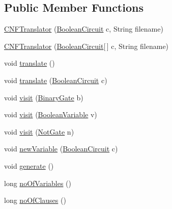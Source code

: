 \subsection*{Public Member Functions}
\begin{DoxyCompactItemize}
\item 
\hyperlink{classuran_1_1formula_1_1cnf_1_1_c_n_f_translator_ae56a0dc54a2ef3be4ddb496b57ba224d}{C\+N\+F\+Translator} (\hyperlink{classuran_1_1formula_1_1cnf_1_1_boolean_circuit}{Boolean\+Circuit} c, String filename)
\item 
\hyperlink{classuran_1_1formula_1_1cnf_1_1_c_n_f_translator_a9f75243260e3af2aebe1e1466bbe5996}{C\+N\+F\+Translator} (\hyperlink{classuran_1_1formula_1_1cnf_1_1_boolean_circuit}{Boolean\+Circuit}\mbox{[}$\,$\mbox{]} c, String filename)
\item 
void \hyperlink{classuran_1_1formula_1_1cnf_1_1_c_n_f_translator_a8cfa090e193eeb2a77a013a1d462576e}{translate} ()
\item 
void \hyperlink{classuran_1_1formula_1_1cnf_1_1_c_n_f_translator_a9d52eae57163cb730e343c1071cf0091}{translate} (\hyperlink{classuran_1_1formula_1_1cnf_1_1_boolean_circuit}{Boolean\+Circuit} c)
\item 
void \hyperlink{classuran_1_1formula_1_1cnf_1_1_c_n_f_translator_a3248f27b474b29e715e86fa4accf99eb}{visit} (\hyperlink{classuran_1_1formula_1_1cnf_1_1_binary_gate}{Binary\+Gate} b)
\item 
void \hyperlink{classuran_1_1formula_1_1cnf_1_1_c_n_f_translator_a9e35ea3cb123b609d8ea5eb28cb8a582}{visit} (\hyperlink{classuran_1_1formula_1_1cnf_1_1_boolean_variable}{Boolean\+Variable} v)
\item 
void \hyperlink{classuran_1_1formula_1_1cnf_1_1_c_n_f_translator_ae1e16723069c2bc4f493a7d04dff4186}{visit} (\hyperlink{classuran_1_1formula_1_1cnf_1_1_not_gate}{Not\+Gate} n)
\item 
void \hyperlink{classuran_1_1formula_1_1cnf_1_1_c_n_f_translator_a647b4754a2c7cedd0cb452463927efff}{new\+Variable} (\hyperlink{classuran_1_1formula_1_1cnf_1_1_boolean_circuit}{Boolean\+Circuit} c)
\item 
void \hyperlink{classuran_1_1formula_1_1cnf_1_1_c_n_f_translator_a623c2f1b2e56c46bbbc3a289aaba0528}{generate} ()
\item 
long \hyperlink{classuran_1_1formula_1_1cnf_1_1_c_n_f_translator_af16fa6b850daf26021eb229b6b5f52ea}{no\+Of\+Variables} ()
\item 
long \hyperlink{classuran_1_1formula_1_1cnf_1_1_c_n_f_translator_a65be5754fdf4c8459126a5941116f0d5}{no\+Of\+Clauses} ()
\end{DoxyCompactItemize}


